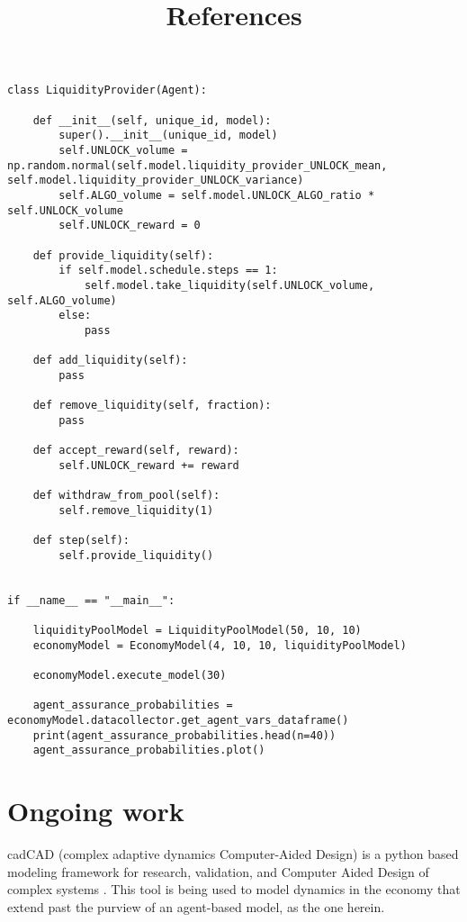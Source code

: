 \documentclass{article}
\begin{document}
\begin{lstlisting}
class LiquidityProvider(Agent):

    def __init__(self, unique_id, model):
        super().__init__(unique_id, model)
        self.UNLOCK_volume = np.random.normal(self.model.liquidity_provider_UNLOCK_mean, self.model.liquidity_provider_UNLOCK_variance)
        self.ALGO_volume = self.model.UNLOCK_ALGO_ratio * self.UNLOCK_volume
        self.UNLOCK_reward = 0

    def provide_liquidity(self):
        if self.model.schedule.steps == 1:
            self.model.take_liquidity(self.UNLOCK_volume, self.ALGO_volume)
        else:
            pass
    
    def add_liquidity(self):
        pass

    def remove_liquidity(self, fraction):
        pass

    def accept_reward(self, reward):
        self.UNLOCK_reward += reward

    def withdraw_from_pool(self):
        self.remove_liquidity(1)

    def step(self):
        self.provide_liquidity()


if __name__ == "__main__":

    liquidityPoolModel = LiquidityPoolModel(50, 10, 10)
    economyModel = EconomyModel(4, 10, 10, liquidityPoolModel)
    
    economyModel.execute_model(30)

    agent_assurance_probabilities = economyModel.datacollector.get_agent_vars_dataframe()
    print(agent_assurance_probabilities.head(n=40))
    agent_assurance_probabilities.plot()

\end{lstlisting}



\section{Ongoing work}
cadCAD (complex adaptive dynamics Computer-Aided Design) is a python based modeling framework for research, validation, and Computer Aided Design of complex systems \cite{cadCAD.org}. This tool is being used to model dynamics in the economy that extend past the purview of an agent-based model, as the one herein.


\pagebreak

\title{References}



 
\end{document}
